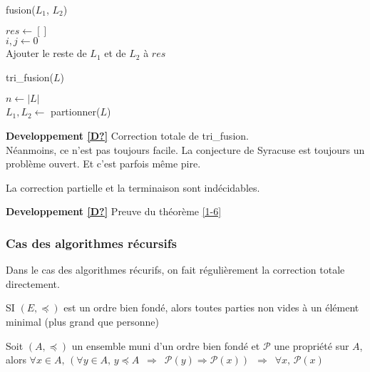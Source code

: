 \begin{example}\enspace\\
	\begin{algorithm}[H]
		\caption{fusion($L_1$, $L_2$)}
		$res \gets []$\\
		$i,j \gets 0$\\
		Ajouter le reste de $L_1$ et de $L_2$ à $res$\\
	\end{algorithm}

	\begin{algorithm}[H]
		\caption{tri\_fusion($L$)}
		$n \gets |L|$\\
		$L_1, L_2 \gets$ partionner($L$)\\
	\end{algorithm}
\end{example}

\textbf{Developpement \ref{D?}} Correction totale de tri\_fusion.\\

Néanmoins, ce n'est pas toujours facile. La conjecture de Syracuse est toujours un problème ouvert. Et c'est parfois même pire.

\begin{theorem}
	La correction partielle et la terminaison sont indécidables. \label{1-6}
\end{theorem}

\textbf{Developpement \ref{D?}} Preuve du théorème \ref{1-6}

\subsubsection{Cas des algorithmes récursifs}

Dans le cas des algorithmes récurifs, on fait régulièrement la correction totale directement.

\begin{proposition}
	SI $(E, \preceq)$ est un ordre bien fondé, alors toutes parties non vides à un élément minimal (plus grand que personne)
\end{proposition}

\begin{theorem}
	\label{1-4}
	Soit $(A, \preceq)$ un ensemble muni d'un ordre bien fondé et $\mathcal P$ une propriété sur $A$, alors $\forall x \in A, \, (\forall y \in A, \, y \preceq A \enspace \Rightarrow \enspace \mathcal P(y) \Rightarrow \mathcal P(x)) \enspace \Rightarrow \enspace \forall x ,\, \mathcal P(x)$
\end{theorem}

